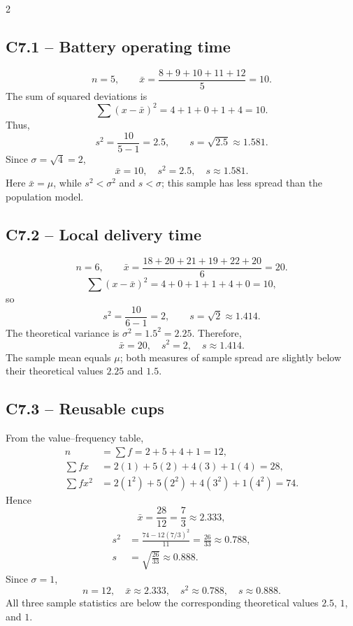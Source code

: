 \setlength{\columnseprule}{0.4pt}
\begin{multicols}{2}


\subsection*{C7.1 -- Battery operating time}
\label{subsec:c7-solution-batteries}

\[
	n=5,\qquad
	\bar{x}=\frac{8+9+10+11+12}{5}=10.
\]
The sum of squared deviations is
\[
	\sum(x-\bar{x})^2
	=4+1+0+1+4=10.
\]
Thus,
\[
	s^2=\frac{10}{5-1}=2.5,\qquad
	s=\sqrt{2.5}\approx1.581.
\]
Since $\sigma=\sqrt{4}=2$,
\[
\boxed{\bar{x}=10,\quad s^2=2.5,\quad s\approx1.581.}
\]
Here $\bar{x}=\mu$, while $s^2<\sigma^2$ and $s<\sigma$; this sample has
less spread than the population model.


\subsection*{C7.2 -- Local delivery time}
\label{subsec:c7-solution-deliveries}

\[
	n=6,\qquad
	\bar{x}=\frac{18+20+21+19+22+20}{6}=20.
\]
\[
	\sum(x-\bar{x})^2=4+0+1+1+4+0=10,
\]
so
\[
	s^2=\frac{10}{6-1}=2,\qquad
	s=\sqrt{2}\approx1.414.
\]
The theoretical variance is $\sigma^2=1.5^2=2.25$. Therefore,
\[
\boxed{\bar{x}=20,\quad s^2=2,\quad s\approx1.414.}
\]
The sample mean equals $\mu$; both measures of sample spread are slightly
below their theoretical values $2.25$ and $1.5$.


\subsection*{C7.3 -- Reusable cups}
\label{subsec:c7-solution-cups}

From the value--frequency table,
\[
\begin{aligned}
	n&=\sum f=2+5+4+1=12,\\
	\sum fx&=2(1)+5(2)+4(3)+1(4)=28,\\
	\sum fx^2&=2(1^2)+5(2^2)+4(3^2)+1(4^2)=74.
\end{aligned}
\]
Hence
\[
	\bar{x}=\frac{28}{12}=\frac73\approx2.333,
\]
\[
	\begin{aligned}
	s^2&=\frac{74-12(7/3)^2}{11}
	=\frac{26}{33}\approx0.788,\\
	s&=\sqrt{\frac{26}{33}}\approx0.888.
	\end{aligned}
\]
Since $\sigma=1$,
\[
\boxed{n=12,\quad\bar{x}\approx2.333,\quad s^2\approx0.788,
	\quad s\approx0.888.}
\]
All three sample statistics are below the corresponding theoretical values
$2.5$, $1$, and $1$.


\end{multicols}

